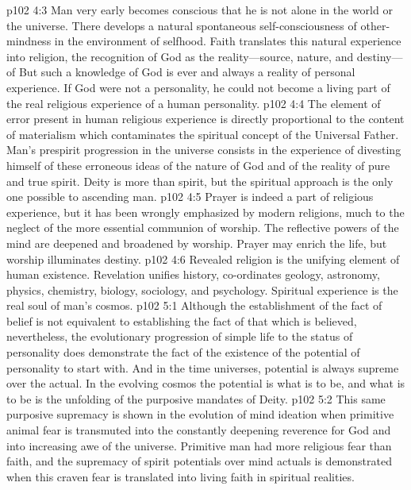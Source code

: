 \vs p102 4:3 Man very early becomes conscious that he is not alone in the world or the universe. There develops a natural spontaneous self\hyp{}consciousness of other\hyp{}mindness in the environment of selfhood. Faith translates this natural experience into religion, the recognition of God as the reality---source, nature, and destiny---of  But such a knowledge of God is ever and always a reality of personal experience. If God were not a personality, he could not become a living part of the real religious experience of a human personality.
\vs p102 4:4 The element of error present in human religious experience is directly proportional to the content of materialism which contaminates the spiritual concept of the Universal Father. Man’s prespirit progression in the universe consists in the experience of divesting himself of these erroneous ideas of the nature of God and of the reality of pure and true spirit. Deity is more than spirit, but the spiritual approach is the only one possible to ascending man.
\pc \vs p102 4:5 Prayer is indeed a part of religious experience, but it has been wrongly emphasized by modern religions, much to the neglect of the more essential communion of worship. The reflective powers of the mind are deepened and broadened by worship. Prayer may enrich the life, but worship illuminates destiny.
\pc \vs p102 4:6 Revealed religion is the unifying element of human existence. Revelation unifies history, co\hyp{}ordinates geology, astronomy, physics, chemistry, biology, sociology, and psychology. Spiritual experience is the real soul of man’s cosmos.
%
\vs p102 5:1 Although the establishment of the fact of belief is not equivalent to establishing the fact of that which is believed, nevertheless, the evolutionary progression of simple life to the status of personality does demonstrate the fact of the existence of the potential of personality to start with. And in the time universes, potential is always supreme over the actual. In the evolving cosmos the potential is what is to be, and what is to be is the unfolding of the purposive mandates of Deity.\plusone
\vs p102 5:2 This same purposive supremacy is shown in the evolution of mind ideation when primitive animal fear is transmuted into the constantly deepening reverence for God and into increasing awe of the universe. Primitive man had more religious fear than faith, and the supremacy of spirit potentials over mind actuals is demonstrated when this craven fear is translated into living faith in spiritual realities.
